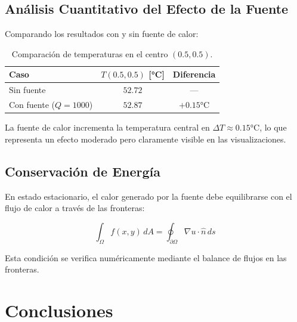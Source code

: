 \documentclass[12pt,a4paper]{article}
\theoremstyle{definition}
\begin{document}
\subsection{An\'{a}lisis Cuantitativo del Efecto de la Fuente}

Comparando los resultados con y sin fuente de calor:

\begin{table}[H]
\centering
\caption{Comparaci\'{o}n de temperaturas en el centro $(0.5, 0.5)$.}
\label{tab:comparacion_centro}
\begin{tabular}{@{}lcc@{}}
\toprule
\textbf{Caso} & \textbf{$T(0.5, 0.5)$ [°C]} & \textbf{Diferencia} \\ \midrule
Sin fuente & $52.72$ & --- \\
Con fuente ($Q = 1000$) & $52.87$ & $+0.15\text{°C}$ \\ \bottomrule
\end{tabular}
\end{table}

La fuente de calor incrementa la temperatura central en $\Delta T \approx 0.15\text{°C}$, lo que representa un efecto moderado pero claramente visible en las visualizaciones.

\subsection{Conservaci\'{o}n de Energ\'{i}a}

En estado estacionario, el calor generado por la fuente debe equilibrarse con el flujo de calor a trav\'{e}s de las fronteras:

\begin{equation}\label{eq:conservacion}
\int_{\Omega} f(x,y) \, dA = \oint_{\partial\Omega} \nabla u \cdot \hat{n} \, ds
\end{equation}

Esta condici\'{o}n se verifica num\'{e}ricamente mediante el balance de flujos en las fronteras.

\section{Conclusiones}\label{sec:conclusiones}
\end{document}
